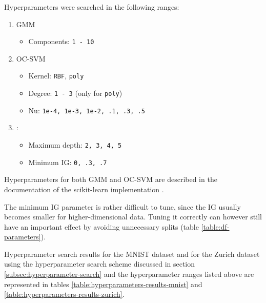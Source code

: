 \documentclass[10pt]{article}
\begin{document}
Hyperparameters were searched in the following ranges:
\begin{enumerate}
    \item \gls{GMM}
    \begin{itemize}
        \item Components: \texttt{1 - 10}
    \end{itemize}
    \item \gls{OC-SVM}
    \begin{itemize}
        \item Kernel: \texttt{\gls{RBF}}, \texttt{poly}
        \item Degree: \texttt{1 - 3} (only for \texttt{poly})
        \item Nu: \texttt{1e-4, 1e-3, 1e-2, .1, .3, .5}
    \end{itemize}
    \item {}:
    \begin{itemize}
        \item Maximum depth: \texttt{2, 3, 4, 5}
        \item Minimum \gls{IG}: \texttt{0, .3, .7}
    \end{itemize}
\end{enumerate}

Hyperparameters for both \gls{GMM} and \gls{OC-SVM}  are described in the documentation of the scikit-learn implementation \cite{scikit-learn}.

The minimum \acrlong{IG} parameter is rather difficult to tune, since the \gls{IG} usually becomes smaller for higher-dimensional data. Tuning it correctly can however still have an important effect by avoiding unnecessary splits (table \ref{table:df-parameters}).

Hyperparameter search results for the \gls{MNIST} dataset and for the Zurich dataset using the hyperparameter search scheme discussed in section \ref{subsec:hyperparameter-search} and the hyperparameter ranges listed above are represented in tables \ref{table:hyperparameters-results-mnist} and \ref{table:hyperparameters-results-zurich}.
\end{document}
